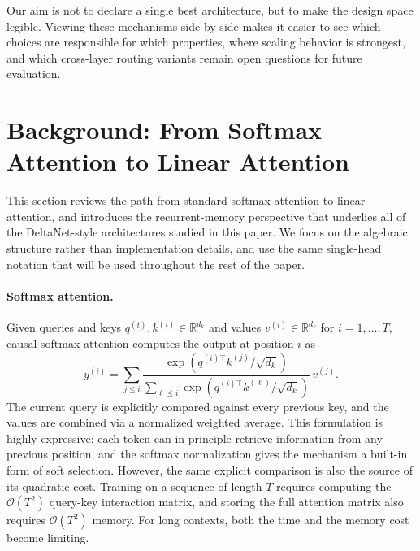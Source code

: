 \documentclass{article}
\begin{document}
Our aim is not to declare a single best architecture, but to make the design space legible. Viewing these mechanisms side by side makes it easier to see which choices are responsible for which properties, where scaling behavior is strongest, and which cross-layer routing variants remain open questions for future evaluation.

\section{Background: From Softmax Attention to Linear Attention}

This section reviews the path from standard softmax attention to linear attention, and introduces the recurrent-memory perspective that underlies all of the DeltaNet-style architectures studied in this paper. We focus on the algebraic structure rather than implementation details, and use the same single-head notation that will be used throughout the rest of the paper.

\paragraph{Softmax attention.}
Given queries and keys $q^{(i)}, k^{(i)} \in \mathbb{R}^{d_k}$ and values $v^{(i)} \in \mathbb{R}^{d_v}$ for $i = 1, \dots, T$, causal softmax attention computes the output at position $i$ as
\begin{equation}
\label{eq:softmax-attention}
y^{(i)}
=
\sum_{j \leq i}
\frac{
\exp\!\left( q^{(i)\top} k^{(j)} / \sqrt{d_k} \right)
}{
\sum_{\ell \leq i}
\exp\!\left( q^{(i)\top} k^{(\ell)} / \sqrt{d_k} \right)
}
\, v^{(j)}.
\end{equation}
The current query is explicitly compared against every previous key, and the values are combined via a normalized weighted average. This formulation is highly expressive: each token can in principle retrieve information from any previous position, and the softmax normalization gives the mechanism a built-in form of soft selection. However, the same explicit comparison is also the source of its quadratic cost. Training on a sequence of length $T$ requires computing the $\mathcal{O}(T^2)$ query-key interaction matrix, and storing the full attention matrix also requires $\mathcal{O}(T^2)$ memory. For long contexts, both the time and the memory cost become limiting.
\end{document}

